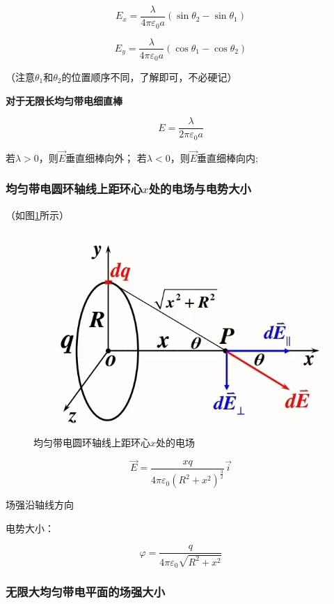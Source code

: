 \documentclass{ctexart}
\begin{document}
$$E_x=\frac{\lambda}{4\pi \varepsilon_0a}(\sin\theta_2-\sin\theta_1)$$

$$E_y=\frac{\lambda}{4\pi \varepsilon_0a}(\cos\theta_1-\cos\theta_2)$$

（注意$\theta_1$和$\theta_2$的位置顺序不同，了解即可，不必硬记）

\textbf{对于无限长均匀带电细直棒}

$$E=\frac{\lambda}{2\pi \varepsilon_0a}$$

若$\lambda >0$，则$\vec{E}$垂直细棒向外；
若$\lambda <0$，则$\vec{E}$垂直细棒向内;

\subsubsection{均匀带电圆环轴线上距环心$x$处的电场与电势大小}

（如图\ref{figure3}所示）

\begin{figure}[h]
	\centering
	\includegraphics[scale=0.4]{images//chapter_10//figure_10.3.jpg} 
	\caption{均匀带电圆环轴线上距环心$x$处的电场}\label{figure3}
\end{figure}

$$\vec{E}=\frac{xq}{4\pi \varepsilon_0 (R^2+x^2)^{\frac{3}{2}}}\vec{i}$$

场强沿轴线方向

电势大小：

$$\varphi=\frac{q}{4\pi \varepsilon_0\sqrt{R^2+x^2}}$$


\subsubsection{无限大均匀带电平面的场强大小}
\end{document}
